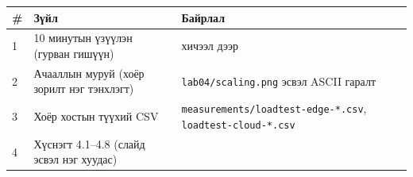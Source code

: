 \begingroup\scriptsize\begin{longtable}[]{@{}lll@{}}
\toprule
\begin{minipage}[b]{0.30\columnwidth}\raggedright
\#\strut
\end{minipage} & \begin{minipage}[b]{0.30\columnwidth}\raggedright
Зүйл\strut
\end{minipage} & \begin{minipage}[b]{0.30\columnwidth}\raggedright
Байрлал\strut
\end{minipage}\tabularnewline
\midrule
\endhead
\begin{minipage}[t]{0.30\columnwidth}\raggedright
1\strut
\end{minipage} & \begin{minipage}[t]{0.30\columnwidth}\raggedright
10 минутын үзүүлэн (гурван гишүүн)\strut
\end{minipage} & \begin{minipage}[t]{0.30\columnwidth}\raggedright
хичээл дээр\strut
\end{minipage}\tabularnewline
\begin{minipage}[t]{0.30\columnwidth}\raggedright
2\strut
\end{minipage} & \begin{minipage}[t]{0.30\columnwidth}\raggedright
Ачааллын муруй (хоёр зорилт нэг тэнхлэгт)\strut
\end{minipage} & \begin{minipage}[t]{0.30\columnwidth}\raggedright
\texttt{lab04/\allowbreak{}scaling.\allowbreak{}png} эсвэл ASCII гаралт\strut
\end{minipage}\tabularnewline
\begin{minipage}[t]{0.30\columnwidth}\raggedright
3\strut
\end{minipage} & \begin{minipage}[t]{0.30\columnwidth}\raggedright
Хоёр хостын түүхий CSV\strut
\end{minipage} & \begin{minipage}[t]{0.30\columnwidth}\raggedright
\texttt{measurements/\allowbreak{}loadtest-edge-*.\allowbreak{}csv}, \texttt{loadtest-cloud-*.\allowbreak{}csv}\strut
\end{minipage}\tabularnewline
\begin{minipage}[t]{0.30\columnwidth}\raggedright
4\strut
\end{minipage} & \begin{minipage}[t]{0.30\columnwidth}\raggedright
Хүснэгт 4.1--4.8 (слайд эсвэл нэг хуудас)\strut

\end{minipage}
\end{longtable}
